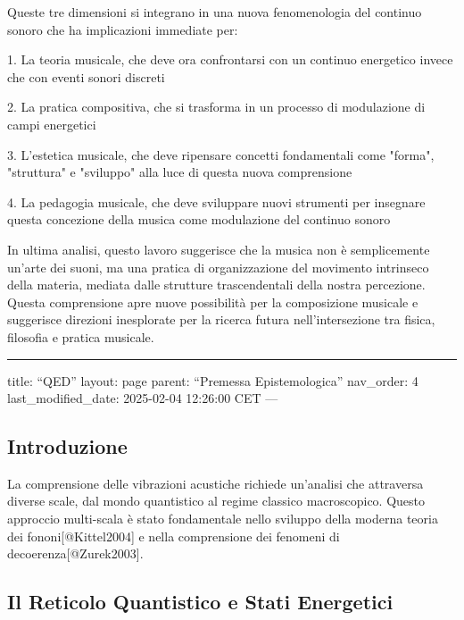 \documentclass[a4paper,11pt]{article}
\begin{document}
Queste tre dimensioni si integrano in una nuova fenomenologia del
continuo sonoro che ha implicazioni immediate per:

1. La teoria musicale, che deve ora confrontarsi con un continuo
energetico invece che con eventi sonori discreti

2. La pratica compositiva, che si trasforma in un processo di
modulazione di campi energetici

3. L'estetica musicale, che deve ripensare concetti fondamentali come
"forma", "struttura" e "sviluppo" alla luce di questa nuova
comprensione

4. La pedagogia musicale, che deve sviluppare nuovi strumenti per
insegnare questa concezione della musica come modulazione del continuo
sonoro

In ultima analisi, questo lavoro suggerisce che la musica non è
semplicemente un'arte dei suoni, ma una pratica di organizzazione del
movimento intrinseco della materia, mediata dalle strutture
trascendentali della nostra percezione. Questa comprensione apre nuove
possibilità per la composizione musicale e suggerisce direzioni
inesplorate per la ricerca futura nell'intersezione tra fisica,
filosofia e pratica musicale.



\begin{center}
\rule{3in}{0.4pt}
\end{center}
title: ``QED''
layout: page
parent: ``Premessa Epistemologica''
nav\_order: 4
last\_modified\_date: 2025-02-04 12:26:00 CET
---

\subsection{Introduzione}\hypertarget{introduzione}{}\label{introduzione}

La comprensione delle vibrazioni acustiche richiede un'analisi che
attraversa diverse scale, dal mondo quantistico al regime classico
macroscopico. Questo approccio multi-scala è stato fondamentale nello
sviluppo della moderna teoria dei fononi{[}@Kittel2004{]} e nella
comprensione dei fenomeni di decoerenza{[}@Zurek2003{]}.

\subsection{Il Reticolo Quantistico e Stati Energetici}\hypertarget{il-reticolo-quantistico-e-stati-energetici}{}\label{il-reticolo-quantistico-e-stati-energetici}
\end{document}
